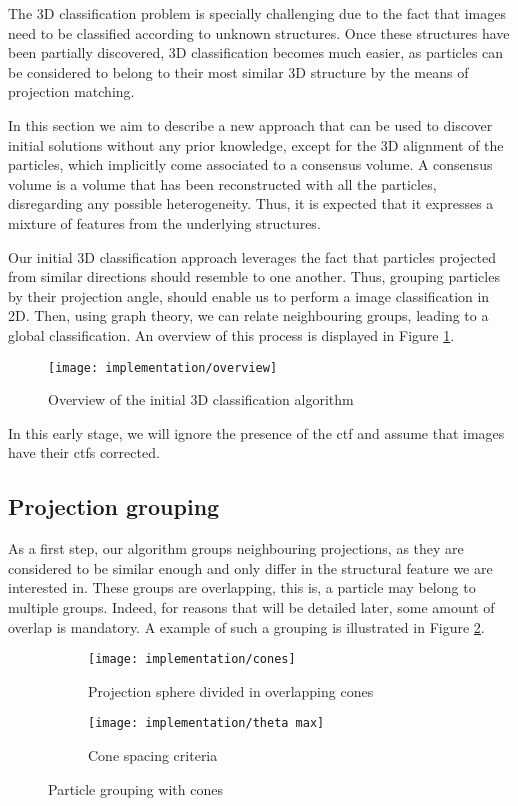 \documentclass[../main.tex]{subfiles}
\begin{document}
The 3D classification problem is specially challenging due to the fact that images need to be classified according to unknown structures. Once these structures have been partially discovered, 3D classification becomes much easier, as particles can be considered to belong to their most similar 3D structure by the means of projection matching.

In this section we aim to describe a new approach that can be used to discover initial solutions without any prior knowledge, except for the 3D alignment of the particles, which implicitly come associated to a consensus volume. A consensus volume is a volume that has been reconstructed with all the particles, disregarding any possible heterogeneity. Thus, it is expected that it expresses a mixture of features from the underlying structures.

Our initial 3D classification approach leverages the fact that particles projected from similar directions should resemble to one another. Thus, grouping particles by their projection angle, should enable us to perform a image classification in 2D. Then, using graph theory, we can relate neighbouring groups, leading to a global classification. An overview of this process is displayed in Figure \ref{fig:4.1:overview}.

\begin{figure}[hbp]
    \centering
    \texttt{[image: implementation/overview]}
    \caption{Overview of the initial 3D classification algorithm}
    \label{fig:4.1:overview}
\end{figure}

In this early stage, we will ignore the presence of the \gls{ctf} and assume that images have their \glspl{ctf} corrected.

\subsection{Projection grouping}
As a first step, our algorithm groups neighbouring projections, as they are considered to be similar enough and only differ in the structural feature we are interested in. These groups are overlapping, this is, a particle may belong to multiple groups. Indeed, for reasons that will be detailed later, some amount of overlap is mandatory. A example of such a grouping is illustrated in Figure \ref{fig:4.1:cones}.

\begin{figure}[hbp]
    \centering
    \begin{subfigure}[b]{0.6\textwidth}
         \centering
         \texttt{[image: implementation/cones]}
         \caption{Projection sphere divided in overlapping cones}
    \end{subfigure}
    \begin{subfigure}[b]{0.3\textwidth}
         \centering
         \texttt{[image: implementation/theta max]}
         \caption{Cone spacing criteria}
    \end{subfigure}
    \caption{Particle grouping with cones}
    \label{fig:4.1:cones}
\end{figure}
\end{document}
